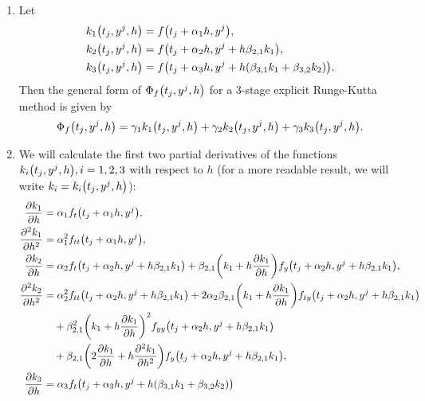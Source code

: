 \documentclass{exercise}
\begin{document}
	\begin{enumerate}
		\item Let
		\begin{align*}
			k_1\parentheses*{t_j, y^j, h} &= f\parentheses*{t_j + \alpha_1 h, y^j},\\
			k_2\parentheses*{t_j, y^j, h} &= f\parentheses*{t_j + \alpha_2 h, y^j + h\beta_{2, 1}k_1},\\
			k_3\parentheses*{t_j, y^j, h} &= f\parentheses*{t_j + \alpha_3 h, y^j + h\parentheses*{\beta_{3, 1}k_1 + \beta_{3, 2}k_2}}.
		\end{align*}
		Then the general form of \(\Phi_f\parentheses*{t_j, y^j, h}\) for a 3-stage explicit Runge-Kutta method is given by
		\[
			\Phi_f\parentheses*{t_j, y^j, h} = \gamma_1 k_1\parentheses*{t_j, y^j, h} + \gamma_2 k_2\parentheses*{t_j, y^j, h} + \gamma_3 k_3\parentheses*{t_j, y^j, h}.
		\]
		\item We will calculate the first two partial derivatives of the functions \(k_i\parentheses*{t_j, y^j, h}, i = 1, 2, 3\) with respect to \(h\) (for a more readable result, we will write \(k_i = k_i\parentheses*{t_j, y^j, h}\)):
		\begin{align*}
			\frac{\partial k_1}{\partial h} &= \alpha_1 f_t\parentheses*{t_j + \alpha_1 h, y^j},\\
			\frac{\partial^2 k_1}{\partial h^2} &= \alpha_1^2 f_{tt}\parentheses*{t_j + \alpha_1 h, y^j},\\
			\frac{\partial k_2}{\partial h} &= \alpha_2 f_t\parentheses*{t_j + \alpha_2 h, y^j + h\beta_{2, 1}k_1} + \beta_{2, 1}\parentheses*{k_1 + h\frac{\partial k_1}{\partial h}}f_y\parentheses*{t_j + \alpha_2 h, y^j + h\beta_{2, 1}k_1},\\
			\frac{\partial^2 k_2}{\partial h^2} &= \alpha_2^2 f_{tt}\parentheses*{t_j + \alpha_2 h, y^j + h\beta_{2, 1}k_1} + 2\alpha_2 \beta_{2, 1}\parentheses*{k_1 + h\frac{\partial k_1}{\partial h}}f_{ty}\parentheses*{t_j + \alpha_2 h, y^j + h\beta_{2, 1}k_1}\\
			&\quad + \beta_{2, 1}^2 \parentheses*{k_1 + h\frac{\partial k_1}{\partial h}}^2 f_{yy}\parentheses*{t_j + \alpha_2 h, y^j + h\beta_{2, 1}k_1}\\
			&\quad + \beta_{2, 1}\parentheses*{2\frac{\partial k_1}{\partial h} + h\frac{\partial^2 k_1}{\partial h^2}}f_y\parentheses*{t_j + \alpha_2 h, y^j + h\beta_{2, 1}k_1},\\
			\frac{\partial k_3}{\partial h} &= \alpha_3 f_t\parentheses*{t_j + \alpha_3 h, y^j + h\parentheses*{\beta_{3, 1}k_1 + \beta_{3, 2}k_2}}\\

\end{align*}
\end{enumerate}
\end{document}
